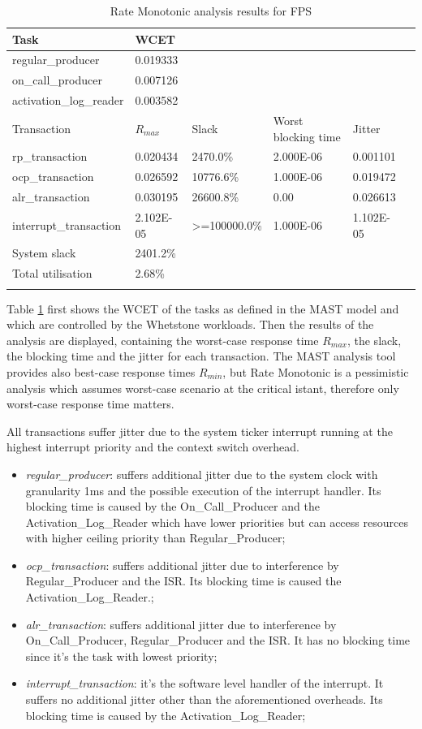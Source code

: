 \documentclass{article}
\begin{document}
\begin{longtable}{llllll}
   \toprule
   Task & WCET \\
   \midrule
   regular\_producer & 0.019333 \\
   on\_call\_producer & 0.007126 \\
   activation\_log\_reader & 0.003582 \\
   \toprule
   \toprule
   Transaction & $R_{max}$ & Slack & Worst blocking time & Jitter \\
   \midrule
   rp\_transaction & 0.020434  & 2470.0\% &  2.000E-06 & 0.001101 \\
   ocp\_transaction & 0.026592 & 10776.6\% & 1.000E-06 & 0.019472 \\
   alr\_transaction & 0.030195 & 26600.8\% & 0.00 & 0.026613 \\
   interrupt\_transaction & 2.102E-05 & >=100000.0\% & 1.000E-06 & 1.102E-05 \\
   \toprule
   \toprule
   System slack & 2401.2\% \\
   Total utilisation & 2.68\% \\
   \bottomrule
\caption{Rate Monotonic analysis results for FPS}
\label{tab:rm-fps}
\end{longtable}

Table \ref{tab:rm-fps} first shows the WCET of the tasks as defined in the MAST model and which are controlled by the Whetstone workloads. Then the results of the analysis are displayed, containing the worst-case response time $R_{max}$, the slack, the blocking time and the jitter for each transaction. The MAST analysis tool provides also best-case response times $R_{min}$, but Rate Monotonic is a pessimistic analysis which assumes worst-case scenario at the critical istant, therefore only worst-case response time matters.

All transactions suffer jitter due to the system ticker interrupt running at the highest interrupt priority and the context switch overhead.

\begin{itemize}
   \item \textit{regular\_producer}: suffers additional jitter due to the system clock with granularity 1ms and the possible execution of the interrupt handler. Its blocking time is caused by the On\_Call\_Producer and the Activation\_Log\_Reader which have lower priorities but can access resources with higher ceiling priority than Regular\_Producer;
   \item \textit{ocp\_transaction}: suffers additional jitter due to interference by Regular\_Producer and the ISR. Its blocking time is caused the Activation\_Log\_Reader.;
   \item \textit{alr\_transaction}: suffers additional jitter due to interference by On\_Call\_Producer, Regular\_Producer and the ISR. It has no blocking time since it's the task with lowest priority;
   \item \textit{interrupt\_transaction}: it's the software level handler of the interrupt. It suffers no additional jitter other than the aforementioned overheads. Its blocking time is caused by the Activation\_Log\_Reader;
\end{itemize}
\end{document}
